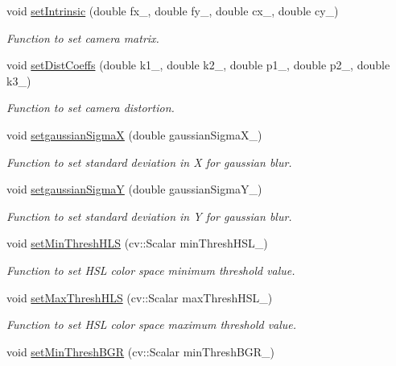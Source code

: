 \begin{DoxyCompactItemize}
void \hyperlink{classImageProcessing_a0432eb5bac73ebc2d81442577f0466ef}{set\+Intrinsic} (double fx\+\_\+, double fy\+\_\+, double cx\+\_\+, double cy\+\_\+)
\begin{DoxyCompactList}\small\item\em Function to set camera matrix. \end{DoxyCompactList}\item 
void \hyperlink{classImageProcessing_a669c1fa1566fec74c944d8a74933bb8f}{set\+Dist\+Coeffs} (double k1\+\_\+, double k2\+\_\+, double p1\+\_\+, double p2\+\_\+, double k3\+\_\+)
\begin{DoxyCompactList}\small\item\em Function to set camera distortion. \end{DoxyCompactList}\item 
void \hyperlink{classImageProcessing_ade164d66f0f51ab799dbc949c03a7b57}{setgaussian\+SigmaX} (double gaussian\+Sigma\+X\+\_\+)
\begin{DoxyCompactList}\small\item\em Function to set standard deviation in X for gaussian blur. \end{DoxyCompactList}\item 
void \hyperlink{classImageProcessing_a4854cd009bb4ad04ab69e1ea701b71c8}{setgaussian\+SigmaY} (double gaussian\+Sigma\+Y\+\_\+)
\begin{DoxyCompactList}\small\item\em Function to set standard deviation in Y for gaussian blur. \end{DoxyCompactList}\item 
void \hyperlink{classImageProcessing_a748f92280f1a0773a56970b787a71682}{set\+Min\+Thresh\+H\+LS} (cv\+::\+Scalar min\+Thresh\+H\+S\+L\+\_\+)
\begin{DoxyCompactList}\small\item\em Function to set H\+SL color space minimum threshold value. \end{DoxyCompactList}\item 
void \hyperlink{classImageProcessing_a2595139a92ad3de27bcaab4a09d95ceb}{set\+Max\+Thresh\+H\+LS} (cv\+::\+Scalar max\+Thresh\+H\+S\+L\+\_\+)
\begin{DoxyCompactList}\small\item\em Function to set H\+SL color space maximum threshold value. \end{DoxyCompactList}\item 
void \hyperlink{classImageProcessing_a64b3a68e766210db6d7e6130d161acb6}{set\+Min\+Thresh\+B\+GR} (cv\+::\+Scalar min\+Thresh\+B\+G\+R\+\_\+)

\end{DoxyCompactItemize}
